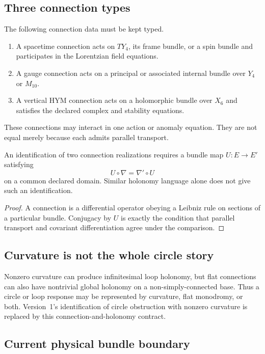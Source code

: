 \documentclass[11pt]{article}
\begin{document}
\subsection{Three connection types}

The following connection data must be kept typed.
\begin{enumerate}
\item A spacetime connection acts on $TY_4$, its frame bundle, or a spin
bundle and participates in the Lorentzian field equations.
\item A gauge connection acts on a principal or associated internal bundle
over $Y_4$ or $M_{10}$.
\item A vertical HYM connection acts on a holomorphic bundle over $X_6$ and
satisfies the declared complex and stability equations.
\end{enumerate}

These connections may interact in one action or anomaly equation.  They are
not equal merely because each admits parallel transport.

\begin{proposition}
An identification of two connection realizations requires a bundle map
$U:E\to E'$ satisfying
\[
 U\circ\nabla=\nabla'\circ U
\]
on a common declared domain.  Similar holonomy language alone does not give
such an identification.
\end{proposition}

\begin{proof}
A connection is a differential operator obeying a Leibniz rule on sections of
a particular bundle.  Conjugacy by $U$ is exactly the condition that parallel
transport and covariant differentiation agree under the comparison.
\end{proof}

\subsection{Curvature is not the whole circle story}

Nonzero curvature can produce infinitesimal loop holonomy, but flat
connections can also have nontrivial global holonomy on a non-simply-connected
base.  Thus a circle or loop response may be represented by curvature,
flat monodromy, or both.  Version~1's identification of circle obstruction
with nonzero curvature is replaced by this connection-and-holonomy contract.

\subsection{Current physical bundle boundary}
\label{sec:hidden-boundary}
\end{document}
